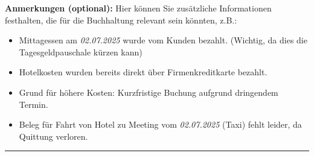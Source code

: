 \documentclass[10pt]{article}
\begin{document}
\normalsize %

\vspace{1em}

\textbf{Anmerkungen (optional):}
Hier können Sie zusätzliche Informationen festhalten, die für die Buchhaltung relevant sein könnten, z.B.:
\begin{itemize}[nosep, leftmargin=1.5em, itemsep=0.2em]
    \item Mittagessen am \textit{02.07.2025} wurde vom Kunden bezahlt. (Wichtig, da dies die Tagesgeldpauschale kürzen kann)
    \item Hotelkosten wurden bereits direkt über Firmenkreditkarte bezahlt.
    \item Grund für höhere Kosten: Kurzfristige Buchung aufgrund dringendem Termin.
    \item Beleg für Fahrt von Hotel zu Meeting vom \textit{02.07.2025} (Taxi) fehlt leider, da Quittung verloren.
\end{itemize}

\noindent\rule{\textwidth}{0.4pt} %
\end{document}

